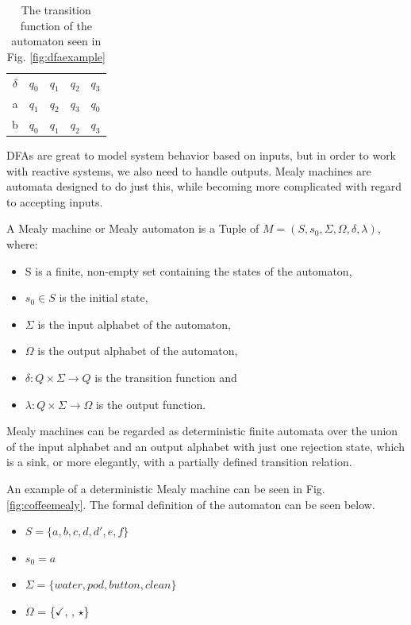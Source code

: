 \begin{table}[H]
\centering
\begin{tabular}{|c|cccc|}
	\hline
	$\delta$ & $q_0$ & $q_1$ & $q_2$ & $q_3$\\ \cline{1-5}
	a & $q_1$ & $q_2$ & $q_3$ & $q_0$ \\	
	b & $q_0$ & $q_1$ & $q_2$ & $q_3$ \\	\hline
\end{tabular}
\caption{The transition function of the automaton seen in Fig. \ref{fig:dfaexample}}
\label{tab:dfaexampledelta}
\end{table}

DFAs are great to model system behavior based on inputs, but in order to work with reactive systems, we also need to handle outputs. Mealy machines are automata designed to do just this, while becoming more complicated with regard to accepting inputs.


\begin{definition}
	A Mealy machine or Mealy automaton is a Tuple of $ M=(S,s_{0},\Sigma,\Omega,\delta,\lambda) $, where:
	\begin{itemize}
		\item S is a finite, non-empty set containing the states of the automaton,
		\item $s_{0} \in S$ is the initial state,
		\item $\Sigma$ is the input alphabet of the automaton,
		\item $\Omega$ is the output alphabet of the automaton,
		\item $\delta: Q\times \Sigma \to Q$ is the transition function and
		\item $\lambda: Q\times \Sigma \to \Omega$ is the output function. 
	\end{itemize}
\end{definition}

Mealy machines can be regarded as deterministic finite automata over the union of the input alphabet and an output alphabet with just one rejection state, which is a sink, or more elegantly, with a partially defined transition relation. 

An example of a deterministic Mealy machine can be seen in Fig. \ref{fig:coffeemealy}. The formal definition of the automaton can be seen below.

\begin{itemize} 
	\item $S = \{a, b, c, d, d', e, f\}$ 
	\item $s_0 = a$
	\item $\Sigma = \{water, pod, button, clean\}$
	\item $\Omega$ = \{$\checkmark$, \Coffeecup, $\star$\}
\end{itemize}

